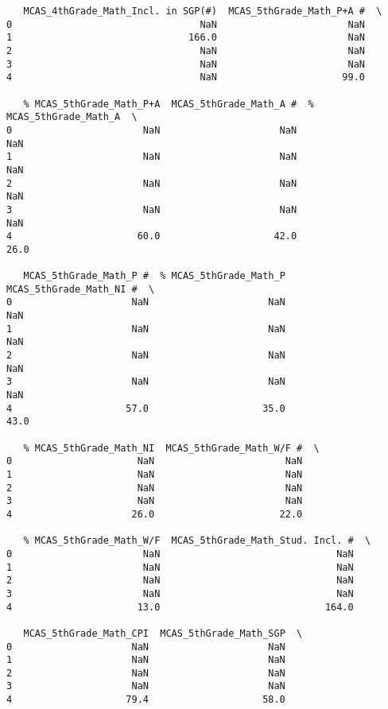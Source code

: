 \documentclass[11pt]{article}
\begin{document}
\begin{verbatim}
   MCAS_4thGrade_Math_Incl. in SGP(#)  MCAS_5thGrade_Math_P+A #  \
0                                 NaN                       NaN   
1                               166.0                       NaN   
2                                 NaN                       NaN   
3                                 NaN                       NaN   
4                                 NaN                      99.0   

   % MCAS_5thGrade_Math_P+A  MCAS_5thGrade_Math_A #  % MCAS_5thGrade_Math_A  \
0                       NaN                     NaN                     NaN   
1                       NaN                     NaN                     NaN   
2                       NaN                     NaN                     NaN   
3                       NaN                     NaN                     NaN   
4                      60.0                    42.0                    26.0   

   MCAS_5thGrade_Math_P #  % MCAS_5thGrade_Math_P  MCAS_5thGrade_Math_NI #  \
0                     NaN                     NaN                      NaN   
1                     NaN                     NaN                      NaN   
2                     NaN                     NaN                      NaN   
3                     NaN                     NaN                      NaN   
4                    57.0                    35.0                     43.0   

   % MCAS_5thGrade_Math_NI  MCAS_5thGrade_Math_W/F #  \
0                      NaN                       NaN   
1                      NaN                       NaN   
2                      NaN                       NaN   
3                      NaN                       NaN   
4                     26.0                      22.0   

   % MCAS_5thGrade_Math_W/F  MCAS_5thGrade_Math_Stud. Incl. #  \
0                       NaN                               NaN   
1                       NaN                               NaN   
2                       NaN                               NaN   
3                       NaN                               NaN   
4                      13.0                             164.0   

   MCAS_5thGrade_Math_CPI  MCAS_5thGrade_Math_SGP  \
0                     NaN                     NaN   
1                     NaN                     NaN   
2                     NaN                     NaN   
3                     NaN                     NaN   
4                    79.4                    58.0   


\end{verbatim}
\end{document}
